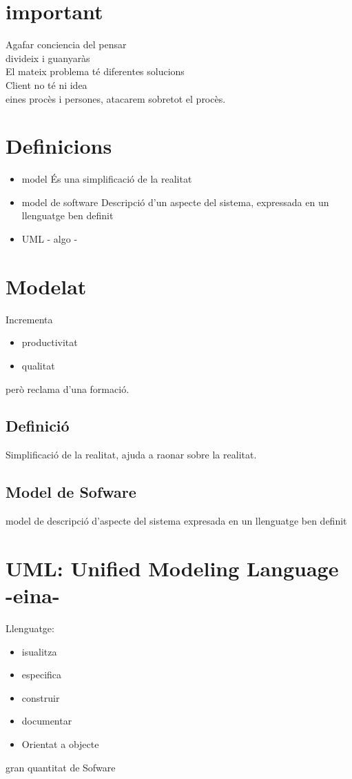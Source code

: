 \documentclass{article}
\begin{document}
\section{important}
Agafar conciencia del pensar\\ divideix i guanyaràs\\
El mateix problema té diferentes solucions\\
Client no té ni idea\\ eines procès i persones, atacarem sobretot el procès.\\

\section{Definicions}
\begin{itemize}
\item model
	\subitem És una simplificació de la realitat
\item model de software
	\subitem Descripció d'un aspecte del sistema, expressada en un llenguatge ben definit
\item UML - algo -
\end{itemize}

\section{Modelat}
Incrementa
\begin{itemize}
	\item productivitat
	\item qualitat
\end{itemize}
però reclama d'una formació.\\
\subsection{Definició}
Simplificació de la realitat, ajuda a raonar sobre la realitat.
\subsection{Model de Sofware}
model de descripció d'aspecte del sistema expresada en un llenguatge ben definit

\section{UML: Unified Modeling Language -eina-}
Llenguatge:
\begin{itemize}
	\item isualitza
	\item especifica
	\item construir
	\item documentar
	\item Orientat a objecte
\end{itemize}
gran quantitat de Sofware
\end{document}
